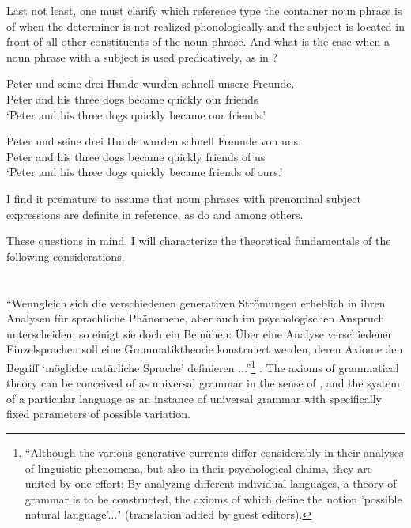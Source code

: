 \documentclass[output=paper,colorlinks,citecolor=brown]{langscibook}
\begin{document}
\noindent Last not least, one must clarify which reference type the container noun phrase is of when the determiner is not realized phonologically and the subject is located in front of all other constituents of the noun phrase. And what is the case when a noun phrase with a subject is used predicatively, as in ?

\ea \label{ex:zi91:5}
    \ea \label{ex:zi91:5a} 
    \gll Peter und seine drei Hunde wurden schnell unsere Freunde.\\
    Peter and his three dogs  became quickly our friends\\
    \glt `Peter and his three dogs quickly became our friends.'
    
    \ex \label{ex:zi91:5b} 
    \gll Peter und seine drei Hunde wurden schnell Freunde von uns.\\
    Peter and his three dogs became quickly friends of us \\
    \glt `Peter and his three dogs quickly became  friends of ours.'\\
    \z
\z

\noindent I find it premature to assume that noun phrases with prenominal subject expressions are definite in reference, as do \citet{Olsen89AGReement-in} and \citet{Bhatt90Die-syntaktische} among others.

These questions in mind, I will characterize the theoretical fundamentals of the following considerations.

\section{} \label{sec:zi91:2}

“Wenngleich sich die verschiedenen generativen Strömungen erheblich in ihren Analysen für sprachliche Phänomene, aber auch im psychologischen Anspruch unterscheiden, so einigt sie doch ein Bemühen: Über eine Analyse verschiedener Einzelsprachen soll eine Grammatiktheorie konstruiert werden, deren Axiome den Begriff ‘mögliche natürliche Sprache’ definieren ...”\footnote{``Although the various generative currents differ considerably in their analyses of linguistic phenomena, but also in their psychological claims, they are united by one effort: By analyzing different individual languages, a theory of grammar is to be constructed, the axioms of which define the notion 'possible natural language'..." (translation added by guest editors).}  \citep[93]{Fanselow88Aufspaltung-von}. The axioms of grammatical theory can be conceived of as universal grammar in the sense of \citet{Chomsky65Aspects-of, Chomsky81Lectures-on-government, Chomsky86Knowledge-of-language}, and the system of a particular language as an instance of universal grammar with specifically fixed parameters of possible variation.
\end{document}
